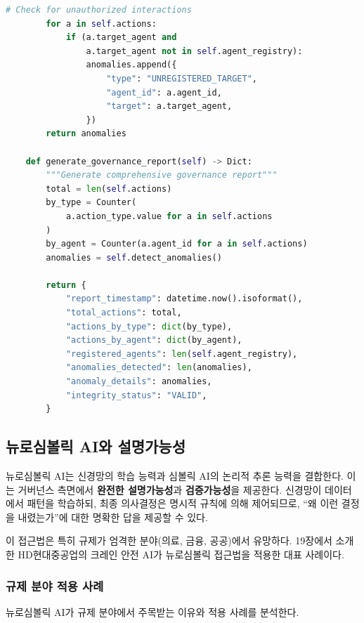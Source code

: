 \begin{lstlisting}[language=Python, caption={멀티에이전트 감사 추적 시스템}, label={lst:multi_agent_audit}]
        # Check for unauthorized interactions
        for a in self.actions:
            if (a.target_agent and
                a.target_agent not in self.agent_registry):
                anomalies.append({
                    "type": "UNREGISTERED_TARGET",
                    "agent_id": a.agent_id,
                    "target": a.target_agent,
                })
        return anomalies

    def generate_governance_report(self) -> Dict:
        """Generate comprehensive governance report"""
        total = len(self.actions)
        by_type = Counter(
            a.action_type.value for a in self.actions
        )
        by_agent = Counter(a.agent_id for a in self.actions)
        anomalies = self.detect_anomalies()

        return {
            "report_timestamp": datetime.now().isoformat(),
            "total_actions": total,
            "actions_by_type": dict(by_type),
            "actions_by_agent": dict(by_agent),
            "registered_agents": len(self.agent_registry),
            "anomalies_detected": len(anomalies),
            "anomaly_details": anomalies,
            "integrity_status": "VALID",
        }
\end{lstlisting}

\subsection{뉴로심볼릭 AI와 설명가능성}
\label{sec:20.1.3}

뉴로심볼릭 AI는 신경망의 학습 능력과 심볼릭 AI의 논리적 추론 능력을 결합한다. 이는 거버넌스 측면에서 \textbf{완전한 설명가능성}과 \textbf{검증가능성}을 제공한다. 신경망이 데이터에서 패턴을 학습하되, 최종 의사결정은 명시적 규칙에 의해 제어되므로, ``왜 이런 결정을 내렸는가''에 대한 명확한 답을 제공할 수 있다.

이 접근법은 특히 규제가 엄격한 분야(의료, 금융, 공공)에서 유망하다. 19장에서 소개한 HD현대중공업의 크레인 안전 AI가 뉴로심볼릭 접근법을 적용한 대표 사례이다.

\subsubsection{규제 분야 적용 사례}

뉴로심볼릭 AI가 규제 분야에서 주목받는 이유와 적용 사례를 분석한다.

